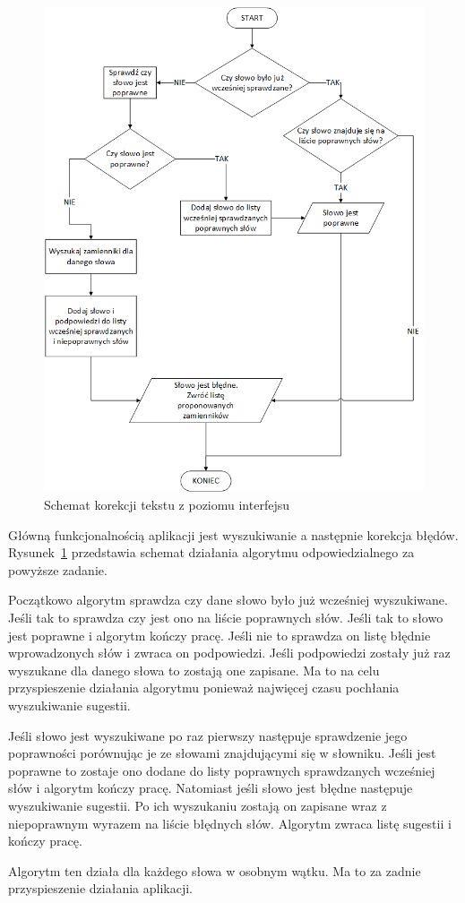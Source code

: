 \begin{figure} [H]
	\centering
	\includegraphics[width=1\linewidth]{rozdzial03/CorectorManager.png}
	\caption{Schemat korekcji tekstu z poziomu interfejsu}
	\label{fig:CorectorManager}
\end{figure}

\newpage

Główną funkcjonalnością aplikacji jest wyszukiwanie a następnie korekcja błędów. Rysunek~\ref{fig:CorectorManager} przedstawia schemat działania algorytmu odpowiedzialnego za powyższe zadanie. 

Początkowo algorytm sprawdza czy dane słowo było już wcześniej wyszukiwane. Jeśli tak to sprawdza czy jest ono na liście poprawnych słów. Jeśli tak to słowo jest poprawne i algorytm kończy pracę. Jeśli nie to sprawdza on listę błędnie wprowadzonych słów i zwraca on podpowiedzi. Jeśli podpowiedzi zostały już raz wyszukane dla danego słowa to zostają one zapisane. Ma to na celu przyspieszenie działania algorytmu ponieważ najwięcej czasu pochłania wyszukiwanie sugestii. 

Jeśli słowo jest wyszukiwane po raz pierwszy następuje sprawdzenie jego poprawności porównując je ze słowami znajdującymi się w słowniku. Jeśli jest poprawne to zostaje ono dodane do listy poprawnych sprawdzanych wcześniej słów i algorytm kończy pracę. Natomiast jeśli słowo jest błędne następuje wyszukiwanie sugestii. Po ich wyszukaniu zostają on zapisane wraz z niepoprawnym wyrazem na liście błędnych słów. Algorytm zwraca listę sugestii i kończy pracę.

Algorytm ten działa dla każdego słowa w osobnym wątku. Ma to za zadnie przyspieszenie działania aplikacji.  

